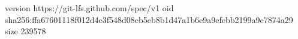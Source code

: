 version https://git-lfs.github.com/spec/v1
oid sha256:ffa67601118f012d4e3f548d08eb5eb8b1d47a1b6e9a9efebb2199a9e7874a29
size 239578
